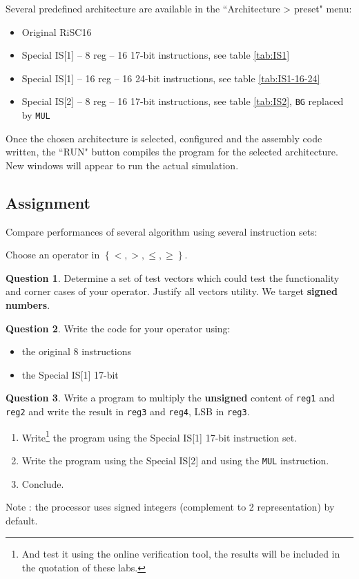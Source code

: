 \documentclass[10pt,a4paper]{article}
\theoremstyle{definition}%
\newtheorem{Q}{Question}[] %
\newcommand{\reg}[1]{\texttt{reg#1}}
\begin{document}
Several predefined architecture are available in the ``Architecture > preset" menu:
\begin{itemize}
\item Original RiSC16
\item Special IS[1] -- 8 reg -- 16 17-bit instructions, see table \vref{tab:IS1}
\item Special IS[1] -- 16 reg -- 16 24-bit instructions, see table \vref{tab:IS1-16-24}
\item Special IS[2] -- 8 reg -- 16 17-bit instructions, see table \vref{tab:IS2}, \verb!BG! replaced by \verb!MUL!
\end{itemize}

Once the chosen architecture is selected, configured and the assembly code written, the ``RUN" button compiles the program for the selected architecture. New windows will appear to run the actual simulation.

\newpage
\subsection{Assignment}

Compare performances of several algorithm using several instruction sets:

\noindent Choose an operator in $\left\lbrace <, >, \leq, \geq \right\rbrace$.

\begin{Q}
	Determine a set of test vectors which could test the functionality and corner cases of your operator. Justify all vectors utility. We target \textbf{signed numbers}.
\end{Q}

\begin{Q}
	Write the code for your operator using:
	\begin{itemize}
	\item the original 8 instructions
	\item the Special IS[1] 17-bit
	\end{itemize}
\end{Q}

\begin{Q}

Write a program to multiply the \textbf{unsigned} content of \reg{1} and \reg{2} and write the result in \reg{3} and \reg{4}, LSB in \reg{3}.
\begin{enumerate}
\item Write\footnote{\label{assign}And test it using the online verification tool, the results will be included in the quotation of these labs.} the program using the Special IS[1] 17-bit instruction set.
\item Write the program using the Special IS[2] and using the \verb!MUL! instruction.
\item Conclude.
\end{enumerate}
Note : the processor uses signed integers (complement to 2 representation) by default.
\end{Q}
\end{document}
